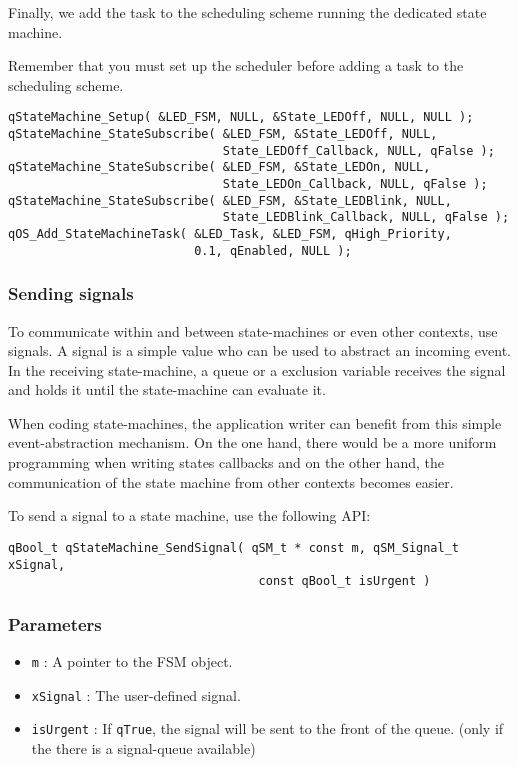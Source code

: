 

Finally, we add the task to the scheduling scheme running the dedicated state machine.

Remember that you must set up the scheduler before adding a task to the scheduling scheme.
\medskip

\begin{lstlisting}[style=CStyle]
qStateMachine_Setup( &LED_FSM, NULL, &State_LEDOff, NULL, NULL ); 
qStateMachine_StateSubscribe( &LED_FSM, &State_LEDOff, NULL, 
                              State_LEDOff_Callback, NULL, qFalse ); 
qStateMachine_StateSubscribe( &LED_FSM, &State_LEDOn, NULL, 
                              State_LEDOn_Callback, NULL, qFalse );
qStateMachine_StateSubscribe( &LED_FSM, &State_LEDBlink, NULL, 
                              State_LEDBlink_Callback, NULL, qFalse ); 
qOS_Add_StateMachineTask( &LED_Task, &LED_FSM, qHigh_Priority, 
                          0.1, qEnabled, NULL );
\end{lstlisting}


\subsubsection{Sending signals}
To communicate within and between state-machines or even other contexts, use signals. A signal is a simple value who can be used to abstract an incoming event. In the receiving state-machine, a queue or a exclusion variable receives the signal and holds it until the state-machine can evaluate it.

When coding state-machines, the application writer can benefit from this simple event-abstraction mechanism. On the one hand, there would be a more uniform programming when writing states callbacks and on the other hand, the communication of the state machine from other contexts becomes easier.

To send a signal to a state machine, use the following API:
\medskip

\begin{lstlisting}[style=CStyle]
 qBool_t qStateMachine_SendSignal( qSM_t * const m, qSM_Signal_t xSignal, 
                                   const qBool_t isUrgent )
\end{lstlisting} 

\subsubsection*{Parameters}
\begin{itemize}
    \item \lstinline{m} : A pointer to the FSM object. 
    \item \lstinline{xSignal} : The user-defined signal.
    \item \lstinline{isUrgent} : If \lstinline{qTrue}, the signal will be sent to the front of the queue. (only if the there is a signal-queue available)
\end{itemize}

